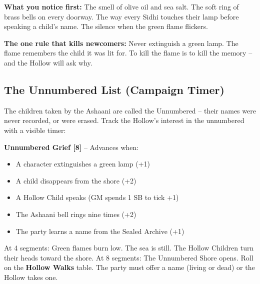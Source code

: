 \textbf{What you notice first:} The smell of olive oil and sea salt. The soft ring of brass bells on every doorway. The way every Sidhi touches their lamp before speaking a child's name. The silence when the green flame flickers.

\textbf{The one rule that kills newcomers:} Never extinguish a green lamp. The flame remembers the child it was lit for. To kill the flame is to kill the memory -- and the Hollow will ask why.

\subsection*{The Unnumbered List (Campaign Timer)}
The children taken by the Ashaani are called the Unnumbered -- their names were never recorded, or were erased. Track the Hollow's interest in the unnumbered with a visible timer:

\textbf{Unnumbered Grief [8]} -- Advances when:
\begin{itemize}
\item A character extinguishes a green lamp (+1)
\item A child disappears from the shore (+2)
\item A Hollow Child speaks (GM spends 1 SB to tick +1)
\item The Ashaani bell rings nine times (+2)
\item The party learns a name from the Sealed Archive (+1)
\end{itemize}
At 4 segments: Green flames burn low. The sea is still. The Hollow Children turn their heads toward the shore.  
At 8 segments: The Unnumbered Shore opens. Roll on the \textbf{Hollow Walks} table. The party must offer a name (living or dead) or the Hollow takes one.


